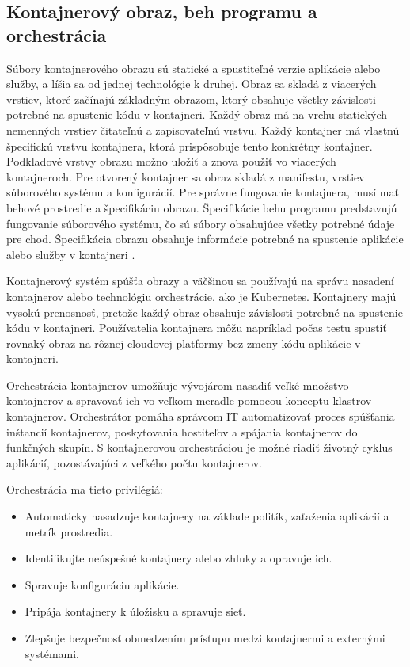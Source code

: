 \subsection{Kontajnerový obraz, beh programu a orchestrácia}

Súbory kontajnerového obrazu sú statické a spustiteľné verzie aplikácie alebo služby, a líšia sa od jednej technológie k druhej. Obraz sa skladá z viacerých vrstiev, ktoré začínajú základným obrazom, ktorý obsahuje všetky závislosti potrebné na spustenie kódu v kontajneri. Každý obraz má na vrchu statických nemenných vrstiev čitateľnú a zapisovateľnú vrstvu. Každý kontajner má vlastnú špecifickú vrstvu kontajnera, ktorá prispôsobuje tento konkrétny kontajner. Podkladové vrstvy obrazu možno uložiť a znova použiť vo viacerých kontajneroch. Pre otvorený kontajner sa obraz skladá z manifestu, vrstiev súborového systému a konfigurácií. Pre správne fungovanie kontajnera, musí mať behové prostredie a špecifikáciu obrazu. Špecifikácie behu programu predstavujú fungovanie súborového systému, čo sú súbory obsahujúce všetky potrebné údaje pre chod. Špecifikácia obrazu obsahuje informácie potrebné na spustenie aplikácie alebo služby v kontajneri \cite{orchestrate}.

Kontajnerový systém spúšťa obrazy a väčšinou sa používajú na správu nasadení kontajnerov alebo technológiu orchestrácie, ako je Kubernetes. Kontajnery majú vysokú prenosnosť, pretože každý obraz obsahuje závislosti potrebné na spustenie kódu v kontajneri. Používatelia kontajnera môžu napríklad počas testu spustiť rovnaký obraz na rôznej cloudovej platformy bez zmeny kódu aplikácie v kontajneri.

Orchestrácia kontajnerov umožňuje vývojárom nasadiť veľké množstvo kontajnerov a spravovať ich vo veľkom meradle pomocou konceptu klastrov kontajnerov. Orchestrátor pomáha správcom IT automatizovať proces spúšťania inštancií kontajnerov, poskytovania hostiteľov a spájania kontajnerov do funkčných skupín. S kontajnerovou orchestráciou je možné riadiť životný cyklus aplikácií, pozostávajúci z veľkého počtu kontajnerov.

Orchestrácia ma tieto privilégiá:

\begin{itemize}
	\item Automaticky nasadzuje kontajnery na základe politík, zaťaženia aplikácií a metrík prostredia.
	\item Identifikujte neúspešné kontajnery alebo zhluky a opravuje ich.
	\item Spravuje konfiguráciu aplikácie.
	\item Pripája kontajnery k úložisku a spravuje sieť.
	\item Zlepšuje bezpečnosť obmedzením prístupu medzi kontajnermi a externými systémami.
\end{itemize}

